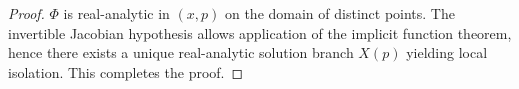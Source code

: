\begin{proof}
\(\Phi\) is real-analytic in \((x,p)\) on the domain of distinct points.
The invertible Jacobian hypothesis allows application of the implicit function theorem, hence there exists a unique real-analytic solution branch \(X(p)\) yielding local isolation. This completes the proof.
\end{proof}

\endinput








